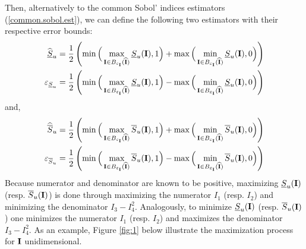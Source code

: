Then, alternatively to the common Sobol' indices estimators (\ref{common.sobol.est}), we can define the following two estimators with their respective error bounds:
\begin{gather}
\begin{aligned}
\widehat{\underline{S}}_u & = \frac{1}{2}\left(\min\Big{(}\max_{\boldsymbol{\mathbf{I}}\in B_{\varepsilon_{\boldsymbol{\mathbf{I}}}}(\widehat{\boldsymbol{\mathbf{I}}})} \underline{S}_u(\boldsymbol{\mathbf{I}}),1\Big{)} + \max\Big{(}\min_{\boldsymbol{\mathbf{I}}\in B_{\varepsilon_{\boldsymbol{\mathbf{I}}}}(\widehat{\boldsymbol{\mathbf{I}}})} \underline{S}_u(\boldsymbol{\mathbf{I}}),0\Big{)} \right) \\
\varepsilon_{\underline{S}_u} & = \frac{1}{2}\left(\min\Big{(}\max_{\boldsymbol{\mathbf{I}}\in B_{\varepsilon_{\boldsymbol{\mathbf{I}}}}(\widehat{\boldsymbol{\mathbf{I}}})} \underline{S}_u(\boldsymbol{\mathbf{I}}),1\Big{)} - \max\Big{(}\min_{\boldsymbol{\mathbf{I}}\in B_{\varepsilon_{\boldsymbol{\mathbf{I}}}}(\widehat{\boldsymbol{\mathbf{I}}})} \underline{S}_u(\boldsymbol{\mathbf{I}}),0\Big{)} \right)
\end{aligned}
\label{formula_undersu}
\end{gather}
and,
\begin{gather}
\begin{aligned}
\widehat{\overline{S}}_u & = \frac{1}{2}\left(\min\Big{(}\max_{\boldsymbol{\mathbf{I}}\in B_{\varepsilon_{\boldsymbol{\mathbf{I}}}}(\widehat{\boldsymbol{\mathbf{I}}})} \overline{S}_u(\boldsymbol{\mathbf{I}}),1\Big{)} + \max\Big{(}\min_{\boldsymbol{\mathbf{I}}\in B_{\varepsilon_{\boldsymbol{\mathbf{I}}}}(\widehat{\boldsymbol{\mathbf{I}}})} \overline{S}_u(\boldsymbol{\mathbf{I}}),0\Big{)} \right) \\
\varepsilon_{\overline{S}_u} & = \frac{1}{2}\left(\min\Big{(}\max_{\boldsymbol{\mathbf{I}}\in B_{\varepsilon_{\boldsymbol{\mathbf{I}}}}(\widehat{\boldsymbol{\mathbf{I}}})} \overline{S}_u(\boldsymbol{\mathbf{I}}),1\Big{)} - \max\Big{(}\min_{\boldsymbol{\mathbf{I}}\in B_{\varepsilon_{\boldsymbol{\mathbf{I}}}}(\widehat{\boldsymbol{\mathbf{I}}})} \overline{S}_u(\boldsymbol{\mathbf{I}}),0\Big{)} \right)
\end{aligned}
\label{formula_oversu}
\end{gather}
Because numerator and denominator are known to be positive, maximizing $\underline{S}_u(\boldsymbol{\mathbf{I}})$ (resp. $\overline{S}_u(\boldsymbol{\mathbf{I}})$) is done through maximizing the numerator $I_1$ (resp. $I_2$) and minimizing the denominator $I_3-I_4^2$. Analogously, to minimize $\underline{S}_u(\boldsymbol{\mathbf{I}})$ (resp. $\overline{S}_u(\boldsymbol{\mathbf{I}})$) one minimizes the numerator $I_1$ (resp. $I_2$) and maximizes the denominator $I_3-I_4^2$. As an example, Figure \ref{fig:1} below illustrate the maximization process for $\boldsymbol{\mathbf{I}}$ unidimensional.
